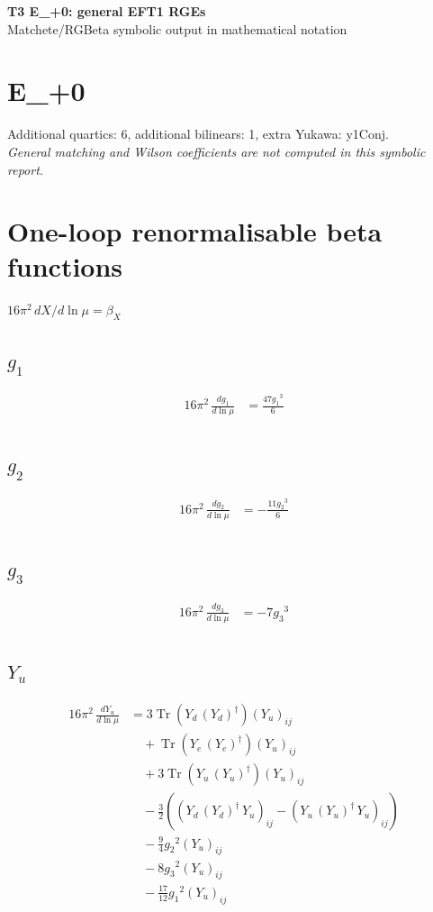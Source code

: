 \documentclass[10pt,a4paper]{article}
\begin{document}
\begin{center}
{\Large\bfseries T3 E\_+0: general EFT1 RGEs}\\[4pt]
Matchete/RGBeta symbolic output in mathematical notation
\end{center}
\bigskip
\section*{E\_+0}
Additional quartics: 6, additional bilinears: 1, extra Yukawa: y1Conj.\\
\emph{General matching and Wilson coefficients are not computed in this symbolic report.}
\clearpage
\section*{One-loop renormalisable beta functions}
$16\pi^2\,dX/d\ln\mu=\beta_X$
\subsection*{$g_1$}
\begin{align*}
16\pi^2\,\frac{d g_1}{d\ln\mu} &=\frac{47 {g_1}^3}{6} \\
\end{align*}
\subsection*{$g_2$}
\begin{align*}
16\pi^2\,\frac{d g_2}{d\ln\mu} &=-\frac{11 {g_2}^3}{6} \\
\end{align*}
\subsection*{$g_3$}
\begin{align*}
16\pi^2\,\frac{d g_3}{d\ln\mu} &=-7 {g_3}^3 \\
\end{align*}
\subsection*{$Y_u$}
\begin{align*}
16\pi^2\,\frac{d Y_u}{d\ln\mu} &=3 \operatorname{Tr}\!\left({Y_d}\,\left({Y_d}\right)^{\dagger}\right) \left({Y_u}\right)_{ij} \\
&\quad +\operatorname{Tr}\!\left({Y_e}\,\left({Y_e}\right)^{\dagger}\right) \left({Y_u}\right)_{ij} \\
&\quad +3 \operatorname{Tr}\!\left({Y_u}\,\left({Y_u}\right)^{\dagger}\right) \left({Y_u}\right)_{ij} \\
&\quad -\frac{3}{2} (\left({Y_d}\,\left({Y_d}\right)^{\dagger}\,{Y_u}\right)_{ij}-\left({Y_u}\,\left({Y_u}\right)^{\dagger}\,{Y_u}\right)_{ij}) \\
&\quad -\frac{9}{4} {g_2}^2 \left({Y_u}\right)_{ij} \\
&\quad -8 {g_3}^2 \left({Y_u}\right)_{ij} \\
&\quad -\frac{17}{12} {g_1}^2 \left({Y_u}\right)_{ij} \\
\end{align*}
\end{document}
